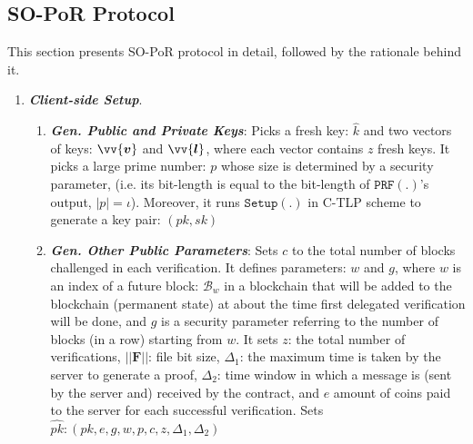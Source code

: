 %

\subsection{SO-PoR Protocol}\label{SO-PoR-Protocol}
This section presents SO-PoR protocol in detail, followed by the rationale behind it.      





\begin{enumerate}[leftmargin=.46cm]

\item\textit{\textbf{Client-side Setup}}. 



\begin{enumerate}


\item  \textbf{\textit{\small {Gen. Public and Private Keys}}}:   Picks a fresh key: $\hat{k}$ and two vectors of keys: $\vv{\bm{v}}$ and $\vv{\bm{l}}$, where each vector contains $z$ fresh keys. It picks a large prime number:  $p$ whose size is determined by a security parameter, (i.e. its bit-length is equal to the bit-length of $\mathtt{PRF}(.)$'s output, $|p|=\iota$).  Moreover, it runs $\mathtt{Setup}(.)$ in  C-TLP scheme to generate a key pair: $(pk, sk)$

\item \textbf{\textit{\small {Gen. Other Public Parameters}}}:  Sets $c$ to the total number of blocks challenged in each verification. It defines  parameters: $w$ and $g$, where  $w$ is an index  of a future block: $\mathcal {B}_{\scriptscriptstyle w}$ in a blockchain that will be added to the blockchain (permanent state) at about the time  first delegated verification will  be done, and $g$ is  a security parameter referring to the number of blocks (in a row) starting from  $w$.  It  sets $z$: the total number of verifications,  $||{\bm{F}}||$: file bit size, $\Delta_{\scriptscriptstyle 1}$:  the maximum time  is taken by the server to generate a proof, $\Delta_{\scriptscriptstyle 2}$: time window in which a message is (sent by the server and) received by the contract, and $e$ amount of coins paid to the server for each successful  verification. Sets $\hat{pk}: (pk,e,g,w,p,c,z,\Delta_{\scriptscriptstyle 1},\Delta_{\scriptscriptstyle 2})$ 



\end{enumerate}
\end{enumerate}
